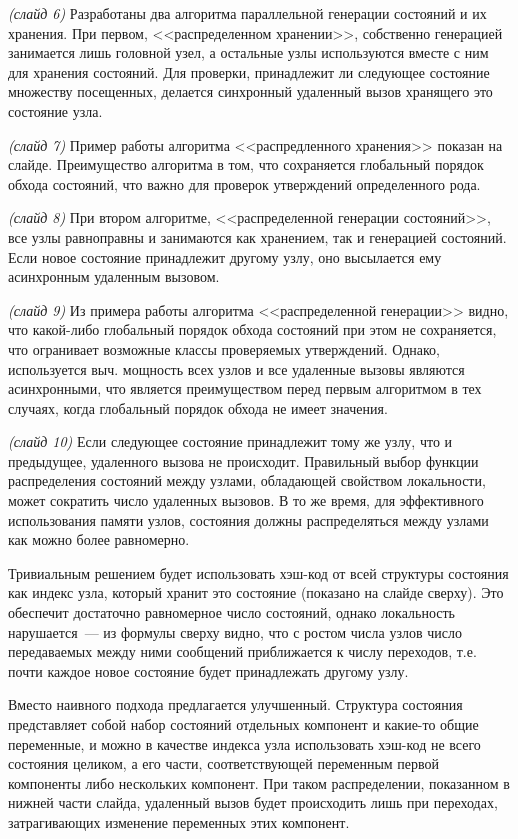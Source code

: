 \documentclass[a4paper,12pt,notitlepage]{article}
\begin{document}
\emph{(слайд 6)} Разработаны два алгоритма параллельной генерации состояний и их
хранения. При первом, <<распределенном хранении>>, собственно генерацией занимается лишь
головной узел, а остальные узлы используются вместе с ним для хранения состояний. Для
проверки, принадлежит ли следующее состояние множеству посещенных, делается синхронный
удаленный вызов хранящего это состояние узла.

\emph{(слайд 7)} Пример работы алгоритма <<распредленного хранения>> показан на
слайде. Преимущество алгоритма в том, что сохраняется глобальный порядок обхода состояний,
что важно для проверок утверждений определенного
рода. %

\emph{(слайд 8)} При втором алгоритме, <<распределенной генерации состояний>>, все узлы
равноправны и занимаются как хранением, так и генерацией состояний. Если новое состояние
принадлежит другому узлу, оно высылается ему асинхронным удаленным вызовом. 

\emph{(слайд 9)} Из примера работы алгоритма <<распределенной генерации>> видно, что
какой-либо глобальный порядок обхода состояний при этом не сохраняется, что огранивает
возможные классы проверяемых утверждений. Однако, используется выч. мощность всех узлов и
все удаленные вызовы являются асинхронными, что является преимуществом перед первым
алгоритмом в тех случаях, когда глобальный порядок обхода не имеет значения.

\emph{(слайд 10)} Если следующее состояние принадлежит тому же узлу, что и предыдущее,
удаленного вызова не происходит. Правильный выбор функции распределения состояний между
узлами, обладающей свойством локальности, может сократить число удаленных вызовов. В то же
время, для эффективного использования памяти узлов, состояния должны распределяться между
узлами как можно более равномерно.

Тривиальным решением будет использовать хэш-код от всей структуры состояния как индекс
узла, который хранит это состояние (показано на слайде сверху). Это обеспечит достаточно
равномерное число состояний, однако локальность нарушается~--- из формулы сверху видно,
что с ростом числа узлов число передаваемых между ними сообщений приближается к числу
переходов, т.е. почти каждое новое состояние будет принадлежать другому узлу.

Вместо наивного подхода предлагается улучшенный. Структура состояния представляет собой
набор состояний отдельных компонент и какие-то общие переменные, и можно в качестве
индекса узла использовать хэш-код не всего состояния целиком, а его части, соответствующей
переменным первой компоненты либо нескольких компонент. При таком распределении,
показанном в нижней части слайда, удаленный вызов будет происходить лишь при переходах,
затрагивающих изменение переменных этих компонент.
\end{document}
